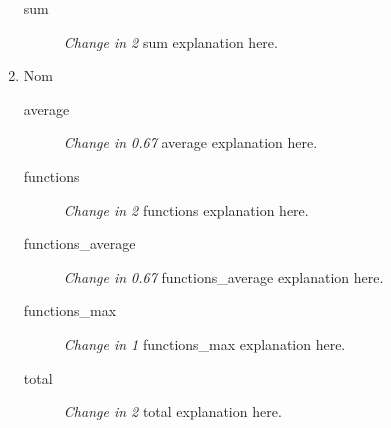 \begin{enumerate}
\begin{description}
          \item [sum] \textit{Change in 2} sum explanation here.
        \end{description}
  \item Nom
        \begin{description}
          \item [average] \textit{Change in 0.67} average explanation here.
          \item [functions] \textit{Change in 2} functions explanation here.
          \item [functions\_average] \textit{Change in 0.67} functions\_average explanation here.
          \item [functions\_max] \textit{Change in 1} functions\_max explanation here.
          \item [total] \textit{Change in 2} total explanation here.
        \end{description}
\end{enumerate}
